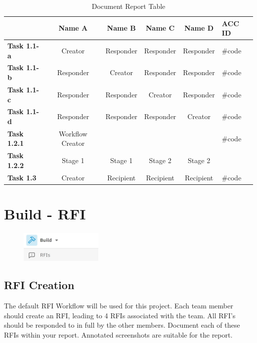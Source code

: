 \begin{table}[ht]
	\centering
	\begin{tabular}{|l|c|c|c|c|l|}
		\hline
		& \textbf{Name A} & \textbf{Name B} & \textbf{Name C} & \textbf{Name D} & \textbf{ACC ID}\\
		\hline
		\textbf{Task 1.1-a} & Creator & Responder & Responder & Responder & \#code\\
		\textbf{Task 1.1-b} & Responder & Creator & Responder & Responder & \#code\\
		\textbf{Task 1.1-c} & Responder & Responder & Creator & Responder & \#code\\
		\textbf{Task 1.1-d} & Responder & Responder & Responder & Creator & \#code\\
		\hline
		\textbf{Task 1.2.1} & Workflow Creator &  &  &  & \#code\\
		\textbf{Task 1.2.2} & Stage 1 & Stage 1 & Stage 2 & Stage 2 & \\
		\hline
		\textbf{Task 1.3} & Creator & Recipient & Recipient & Recipient & \#code\\
		\hline
	\end{tabular}
	\caption{Document Report Table }
	\label{tab:docs-items}
\end{table}





\newpage

\section{Build - RFI}

\begin{figure}[h!t]
	\includegraphics[width=4.0cm]{RevitAssets/rfi}
	\label{fig:projmgmt}
\end{figure}



\subsection{RFI Creation}
The default RFI Workflow will be used for this project.  Each team member should create an RFI, leading to 4 RFIs associated with the team.  All RFI's should be responded to in full by the other members.  Document each of these RFIs within your report. Annotated screenshots are suitable for the report. 


